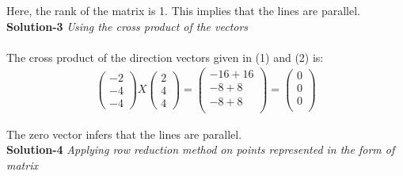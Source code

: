 \documentclass[a4paper,12pt]{article}
\begin{document}
\begin{flushleft}
Here, the rank of the matrix is 1. This implies that the lines are parallel.\\
\vspace{5mm}
\textbf{Solution-3} \textit{Using the cross product of the vectors}\\
\\
The cross product of the direction vectors given in (1) and (2) is: 
\begin{align*}
\begin{pmatrix} -2\\ -4\\ -4 \end{pmatrix} X
\begin{pmatrix}  2\\  4\\  4 \end{pmatrix} =
\begin{pmatrix}
 -16 + 16 \\
 -8+8 \\
 -8+8\\
\end{pmatrix}
=
\begin{pmatrix}
0 \\
0 \\
0\\
\end{pmatrix}
\end{align*}

The zero vector infers that the lines are parallel.\\
\vspace{5mm}
\textbf{Solution-4} \textit{ Applying row reduction method on points represented in the form of matrix}\\


\end{flushleft}
\end{document}
